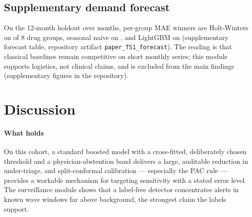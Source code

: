 \documentclass[conference]{IEEEtran}
\begin{document}


\subsection{Supplementary demand forecast}

On the 12-month holdout over \Months{} months, per-group MAE winners are
Holt-Winters on \HWWins{} of 8 drug groups, seasonal naive on \NaiveWins{},
and LightGBM on \LGBMWins{} (supplementary forecast table, repository
artifact \texttt{paper\_TS1\_forecast}). The reading is
that classical baselines remain competitive on short monthly series; this
module supports logistics, not clinical claims, and is excluded from the main
findings (supplementary figures in the repository).

\section{Discussion}
\label{sec:discussion}

\paragraph{What holds}
On this cohort, a standard boosted model with a cross-fitted, deliberately
chosen threshold and a physician-abstention band delivers a large, auditable
reduction in under-triage, and split-conformal calibration --- especially the
PAC rule --- provides a workable mechanism for targeting sensitivity with a
stated error level. The surveillance module shows that a label-free detector
concentrates alerts in known wave windows far above background, the
strongest claim the labels support.
\end{document}
